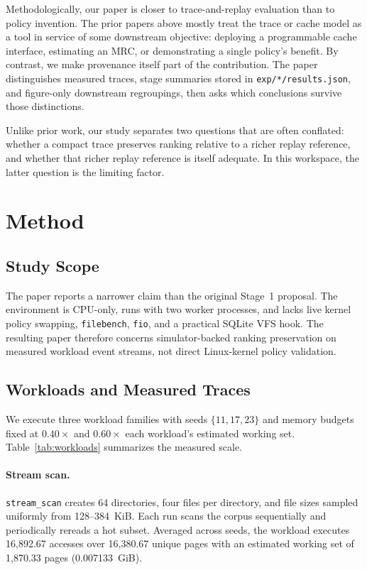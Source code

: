 \documentclass{article}
\begin{document}
Methodologically, our paper is closer to trace-and-replay evaluation than to policy invention. The prior papers above mostly treat the trace or cache model as a tool in service of some downstream objective: deploying a programmable cache interface, estimating an MRC, or demonstrating a single policy's benefit. By contrast, we make provenance itself part of the contribution. The paper distinguishes measured traces, stage summaries stored in \texttt{exp/*/results.json}, and figure-only downstream regroupings, then asks which conclusions survive those distinctions.

Unlike prior work, our study separates two questions that are often conflated: whether a compact trace preserves ranking relative to a richer replay reference, and whether that richer replay reference is itself adequate. In this workspace, the latter question is the limiting factor.

\section{Method}
\label{sec:method}
\subsection{Study Scope}
The paper reports a narrower claim than the original Stage~1 proposal. The environment is CPU-only, runs with two worker processes, and lacks live kernel policy swapping, \texttt{filebench}, \texttt{fio}, and a practical SQLite VFS hook. The resulting paper therefore concerns simulator-backed ranking preservation on measured workload event streams, not direct Linux-kernel policy validation.

\subsection{Workloads and Measured Traces}
We execute three workload families with seeds $\{11,17,23\}$ and memory budgets fixed at $0.40\times$ and $0.60\times$ each workload's estimated working set. Table~\ref{tab:workloads} summarizes the measured scale.

\paragraph{Stream scan.}
\texttt{stream\_scan} creates 64 directories, four files per directory, and file sizes sampled uniformly from 128--384~KiB. Each run scans the corpus sequentially and periodically rereads a hot subset. Averaged across seeds, the workload executes 16{,}892.67 accesses over 16{,}380.67 unique pages with an estimated working set of 1{,}870.33 pages (0.007133~GiB).
\end{document}
